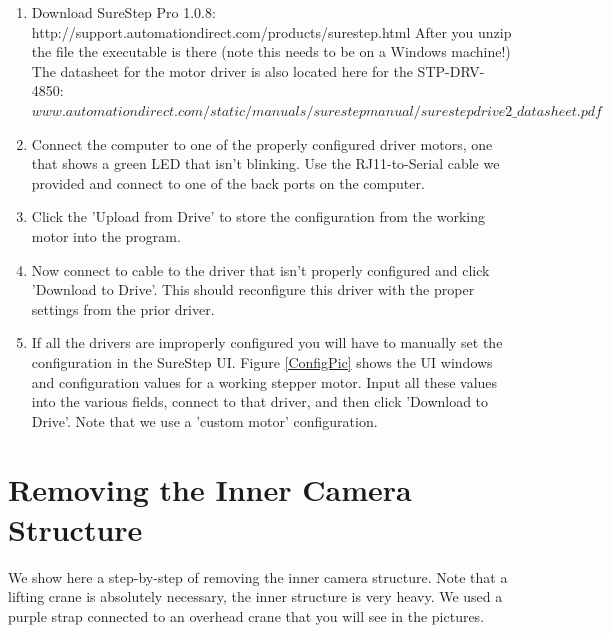 \documentclass[11pt]{article}
\begin{document}
\begin{enumerate}
\item Download SureStep Pro 1.0.8: \newline
http://support.automationdirect.com/products/surestep.html \newline
After you unzip the file the executable is there (note this needs to be on a Windows machine!)
The datasheet for the motor driver is also located here for the STP-DRV-4850: \newline
$www.automationdirect.com/static/manuals/surestepmanual/surestepdrive2\_datasheet.pdf$

\item Connect the computer to one of the properly configured driver motors, one that shows a green LED that isn't blinking. 
Use the RJ11-to-Serial cable we provided and connect to one of the back ports on the computer.

\item Click the 'Upload from Drive' to store the configuration from the working motor into the program.

\item Now connect to cable to the driver that isn't properly configured and click 'Download to Drive'.
This should reconfigure this driver with the proper settings from the prior driver.

\item If all the drivers are improperly configured you will have to manually set the configuration in the SureStep UI.  
Figure \ref{ConfigPic} shows the UI windows and configuration values for a working stepper motor.  
Input all these values into the various fields, connect to that driver, and then click 'Download to Drive'.
Note that we use a 'custom motor' configuration.
\end{enumerate}


\section{Removing the Inner Camera Structure}
We show here a step-by-step of removing the inner camera structure.  
Note that a lifting crane is absolutely necessary, the inner structure is very heavy.
We used a purple strap connected to an overhead crane that you will see in the pictures.
\end{document}
